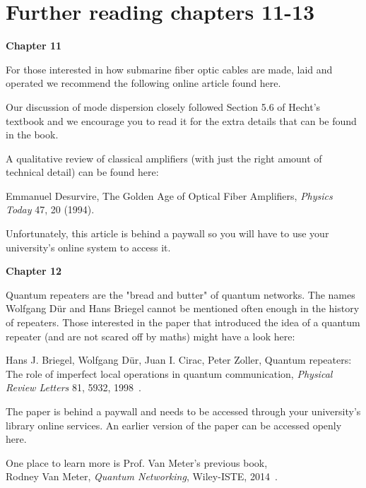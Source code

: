 
\section*{Further reading chapters 11-13}

{\bf Chapter 11}

For those interested in how submarine fiber optic cables are made, laid and operated we recommend the following online article found here.

Our discussion of mode dispersion closely followed Section 5.6 of Hecht’s textbook and we encourage you to read it for the extra details that can be found in the book.

A qualitative review of classical amplifiers (with just the right amount of technical detail) can be found here:

Emmanuel Desurvire, The Golden Age of Optical Fiber Amplifiers, \emph{Physics Today} 47, 20 (1994).

Unfortunately, this article is behind a paywall so you will have to use your university’s online system to access it.

{\bf Chapter 12}

Quantum repeaters are the "bread and butter" of quantum networks. The names Wolfgang D\"ur and Hans Briegel cannot be mentioned often enough in the history of repeaters. Those interested in the paper that introduced the idea of a quantum repeater (and are not scared off by maths) might have a look here:

Hans J. Briegel, Wolfgang Dür, Juan I. Cirac, Peter Zoller, Quantum repeaters: The role of imperfect local operations in quantum communication, \emph{Physical Review Letters} 81, 5932, 1998~\cite{briegel98:_quant_repeater}.

The paper is behind a paywall and needs to be accessed through your university’s library online services. An earlier version of the paper can be accessed openly here.

One place to learn more is Prof. Van Meter's previous book,\\
Rodney Van Meter, \emph{Quantum Networking}, Wiley-ISTE, 2014~\cite{van-meter14:_quantum_networking}.



